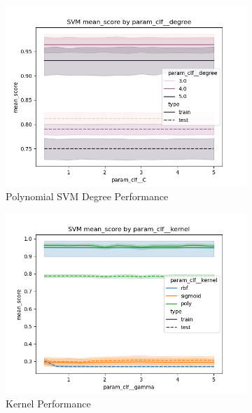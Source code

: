 \documentclass[12pt]{article}
\begin{document}
\begin{figure}
    \begin{subfigure}{.5\textwidth}
      \includegraphics[width=.95\textwidth]{../results_second/svm/param_clf__degree_mean_score_param_clf__C.png}
      \caption{Polynomial SVM Degree Performance}
      \end{subfigure}%
    \begin{subfigure}{.5\textwidth}
      \includegraphics[width=.95\textwidth]{../results_second/svm/param_clf__kernel_mean_score_param_clf__gamma.png}
      \caption{Kernel Performance}
    \end{subfigure}
    \begin{subfigure}{.5\textwidth}

\end{subfigure}
\end{figure}
\end{document}
